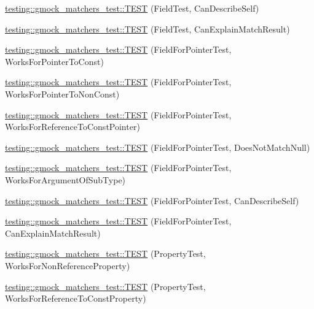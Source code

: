 \begin{DoxyCompactItemize}
\item 
\hyperlink{namespacetesting_1_1gmock__matchers__test_ac43583cb3c4221aa6bd0132c2cb3fed6}{testing\+::gmock\+\_\+matchers\+\_\+test\+::\+T\+E\+ST} (Field\+Test, Can\+Describe\+Self)
\item 
\hyperlink{namespacetesting_1_1gmock__matchers__test_ae1279ce8e2a3a6c6f0d4dbe436c9da02}{testing\+::gmock\+\_\+matchers\+\_\+test\+::\+T\+E\+ST} (Field\+Test, Can\+Explain\+Match\+Result)
\item 
\hyperlink{namespacetesting_1_1gmock__matchers__test_af5c12cdd12f8778074ad0714b83858ed}{testing\+::gmock\+\_\+matchers\+\_\+test\+::\+T\+E\+ST} (Field\+For\+Pointer\+Test, Works\+For\+Pointer\+To\+Const)
\item 
\hyperlink{namespacetesting_1_1gmock__matchers__test_ac339a26bf6100a2eb2dd4bf908f8448c}{testing\+::gmock\+\_\+matchers\+\_\+test\+::\+T\+E\+ST} (Field\+For\+Pointer\+Test, Works\+For\+Pointer\+To\+Non\+Const)
\item 
\hyperlink{namespacetesting_1_1gmock__matchers__test_a603253edc7a2310c8a1db225cb589a99}{testing\+::gmock\+\_\+matchers\+\_\+test\+::\+T\+E\+ST} (Field\+For\+Pointer\+Test, Works\+For\+Reference\+To\+Const\+Pointer)
\item 
\hyperlink{namespacetesting_1_1gmock__matchers__test_a06a1c8d949707ab606627e9f6efe87b9}{testing\+::gmock\+\_\+matchers\+\_\+test\+::\+T\+E\+ST} (Field\+For\+Pointer\+Test, Does\+Not\+Match\+Null)
\item 
\hyperlink{namespacetesting_1_1gmock__matchers__test_a5447541a290e16a81aec6dd975983d57}{testing\+::gmock\+\_\+matchers\+\_\+test\+::\+T\+E\+ST} (Field\+For\+Pointer\+Test, Works\+For\+Argument\+Of\+Sub\+Type)
\item 
\hyperlink{namespacetesting_1_1gmock__matchers__test_a056670af8fc7bd3dfd170435dbf08c3c}{testing\+::gmock\+\_\+matchers\+\_\+test\+::\+T\+E\+ST} (Field\+For\+Pointer\+Test, Can\+Describe\+Self)
\item 
\hyperlink{namespacetesting_1_1gmock__matchers__test_a6a4ffd283f91f4e085aa582aedefe38e}{testing\+::gmock\+\_\+matchers\+\_\+test\+::\+T\+E\+ST} (Field\+For\+Pointer\+Test, Can\+Explain\+Match\+Result)
\item 
\hyperlink{namespacetesting_1_1gmock__matchers__test_a9c42c3b244c7b4d63040e469d5b31e1e}{testing\+::gmock\+\_\+matchers\+\_\+test\+::\+T\+E\+ST} (Property\+Test, Works\+For\+Non\+Reference\+Property)
\item 
\hyperlink{namespacetesting_1_1gmock__matchers__test_a7254899c6d45df648d5b4ef6eece3ae0}{testing\+::gmock\+\_\+matchers\+\_\+test\+::\+T\+E\+ST} (Property\+Test, Works\+For\+Reference\+To\+Const\+Property)

\end{DoxyCompactItemize}
